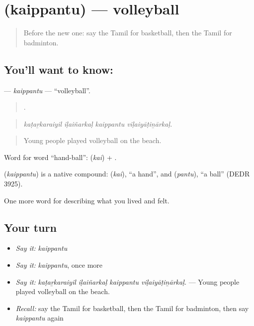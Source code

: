 \section[\texorpdfstring{\ta{கைப்பந்து} (kaippantu)}{கைப்பந்து (kaippantu)}]{ (kaippantu) — volleyball}

\label{lesson:TA-C531-kaippantu}



\begin{quote}
Before the new one: say the Tamil for basketball, then the Tamil for badminton.
\end{quote}

\subsection*{You'll want to know: }
\textbf{} — \emph{kaippantu} — \textquotedblleft{}volleyball\textquotedblright{}.

\begin{quote}
   .
\end{quote}

\begin{quote}
\emph{kaṭaṟkaraiyil iḷaiñarkaḷ kaippantu viḷaiyāṭiṉārkaḷ.}
\end{quote}

\begin{quote}
Young people played volleyball on the beach.
\end{quote}

Word for word \textquotedblleft{}hand-ball\textquotedblright{}:  (\emph{kai}) + .

\begin{cousinweb}
\textbf{} (\emph{kaippantu}) is a native compound:  (\emph{kai}), \textquotedblleft{}a hand\textquotedblright{}, and  (\emph{pantu}), \textquotedblleft{}a ball\textquotedblright{} (DEDR 3925).
\end{cousinweb}

\begin{grammarlens}[title={What you've built}]
One more word for describing what you lived and felt.
\end{grammarlens}

\subsection*{Your turn}
\begin{itemize}
\raggedright
  \item \emph{Say it:} \emph{kaippantu}
  \item \emph{Say it:} \emph{kaippantu}, once more
  \item \emph{Say it:} \emph{kaṭaṟkaraiyil iḷaiñarkaḷ kaippantu viḷaiyāṭiṉārkaḷ.} — Young people played volleyball on the beach.
  \item \emph{Recall:} say the Tamil for basketball, then the Tamil for badminton, then say \emph{kaippantu} again
\end{itemize}

